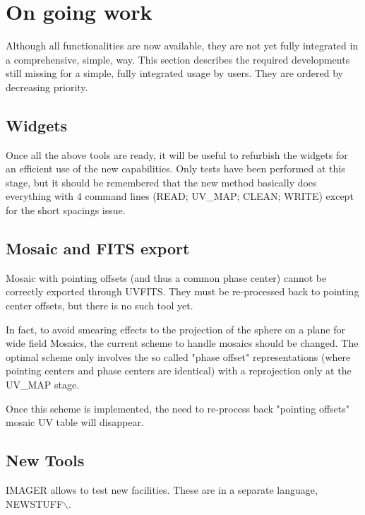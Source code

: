 \documentclass[11pt]{article}
\begin{document}
\section{On going work}

Although all functionalities are now available, they are not yet fully integrated
in a comprehensive, simple, way. This section describes the required developments
still missing for a simple, fully integrated usage by users. They are ordered
by decreasing priority.


\subsection{Widgets}
Once all the above tools are ready,  it will be useful to refurbish the 
widgets for an efficient use of the new capabilities. Only tests have 
been performed at this stage, but it should be remembered that the new 
method basically does everything with 4 command lines (READ;  UV\_MAP; 
CLEAN; WRITE) except for the short spacings issue. 

\subsection{Mosaic and FITS export}
Mosaic with pointing offsets (and thus a common phase center) cannot be 
correctly exported through UVFITS. They must be re-processed back to 
pointing center offsets, but there is no such tool yet.

In fact, to avoid smearing effects to the projection of the sphere
on a plane for wide field Mosaics, the current scheme to handle
mosaics should be changed. The optimal scheme only involves
the so called "phase offset" representations (where pointing centers
and phase centers are identical) with a reprojection only at the
UV\_MAP stage.

Once this scheme is implemented, the need to re-process back
"pointing offsets" mosaic UV table will disappear. 

\subsection{New Tools}

IMAGER  allows to test new facilities.
These are in a separate language, NEWSTUFF$\backslash$. 
\end{document}

